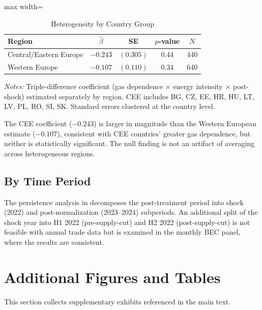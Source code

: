 \documentclass[12pt]{article}
\begin{document}
\begin{table}[htbp]
\centering
\caption{Heterogeneity by Country Group}
\label{tab:het_region}
\begin{adjustbox}{max width=\textwidth}
\begin{tabular}{lcccc}
\hline\hline
Region & $\hat{\beta}$ & SE & $p$-value & $N$ \\
\hline
Central/Eastern Europe & $-0.243$ & $(0.305)$ & 0.44 & 440 \\
Western Europe & $-0.107$ & $(0.110)$ & 0.34 & 640 \\
\hline\hline
\end{tabular}
\end{adjustbox}
\begin{minipage}{0.95\textwidth}
\vspace{0.3em}
\textit{Notes:} Triple-difference coefficient (gas dependence $\times$ energy intensity $\times$ post-shock) estimated separately by region. CEE includes BG, CZ, EE, HR, HU, LT, LV, PL, RO, SI, SK. Standard errors clustered at the country level.
\end{minipage}
\end{table}

The CEE coefficient ($-0.243$) is larger in magnitude than the Western European estimate ($-0.107$), consistent with CEE countries' greater gas dependence, but neither is statistically significant. The null finding is not an artifact of averaging across heterogeneous regions.

\subsection{By Time Period}

The persistence analysis in  decomposes the post-treatment period into shock (2022) and post-normalization (2023--2024) subperiods. An additional split of the shock year into H1 2022 (pre-supply-cut) and H2 2022 (post-supply-cut) is not feasible with annual trade data but is examined in the monthly BEC panel, where the results are consistent.


\section{Additional Figures and Tables}
\label{app:additional}

This section collects supplementary exhibits referenced in the main text.
\end{document}
